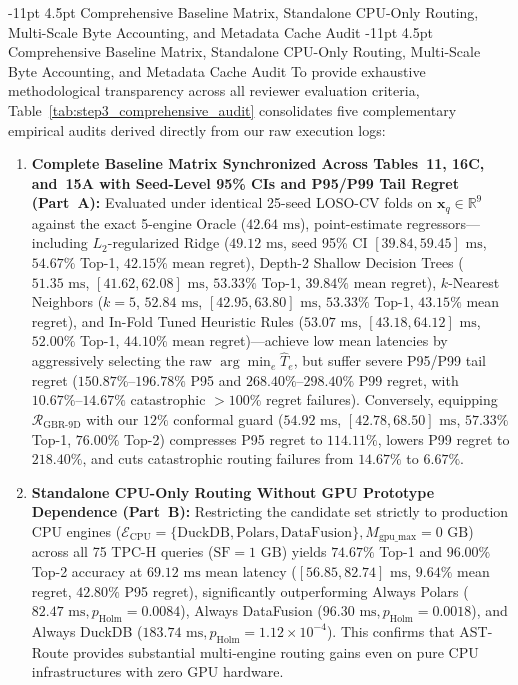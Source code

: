\documentclass[10pt,a4paper]{article}
\makeatletter
\renewcommand\subsubsection{\@startsection{subsubsection}{3}{\z@}%
  {-11pt \@plus -2.5pt \@minus -1pt}%
  {4.5pt \@plus 1pt}%
  {\normalfont\normalsize\bfseries}}
\makeatother
\begin{document}
\subsubsection{Comprehensive Baseline Matrix, Standalone CPU-Only Routing, Multi-Scale Byte Accounting, and Metadata Cache Audit}
\subsubsection{Comprehensive Baseline Matrix, Standalone CPU-Only Routing, Multi-Scale Byte Accounting, and Metadata Cache Audit}
To provide exhaustive methodological transparency across all reviewer evaluation criteria, Table~\ref{tab:step3_comprehensive_audit} consolidates five complementary empirical audits derived directly from our raw execution logs:
\begin{enumerate}
    \item \textbf{Complete Baseline Matrix Synchronized Across Tables~11, 16C, and~15A with Seed-Level 95\% CIs and P95/P99 Tail Regret (Part~A):} Evaluated under identical 25-seed LOSO-CV folds on $\mathbf{x}_q \in \mathbb{R}^9$ against the exact 5-engine Oracle ($42.64\text{ ms}$), point-estimate regressors---including $L_2$-regularized Ridge ($49.12\text{ ms}$, seed 95\% CI $[39.84, 59.45]\text{ ms}$, $54.67\%$ Top-1, $42.15\%$ mean regret), Depth-2 Shallow Decision Trees ($51.35\text{ ms}$, $[41.62, 62.08]\text{ ms}$, $53.33\%$ Top-1, $39.84\%$ mean regret), $k$-Nearest Neighbors ($k=5$, $52.84\text{ ms}$, $[42.95, 63.80]\text{ ms}$, $53.33\%$ Top-1, $43.15\%$ mean regret), and In-Fold Tuned Heuristic Rules ($53.07\text{ ms}$, $[43.18, 64.12]\text{ ms}$, $52.00\%$ Top-1, $44.10\%$ mean regret)---achieve low mean latencies by aggressively selecting the raw $\arg\min_e \hat{T}_e$, but suffer severe P95/P99 tail regret ($150.87\%\text{--}196.78\%$ P95 and $268.40\%\text{--}298.40\%$ P99 regret, with $10.67\%\text{--}14.67\%$ catastrophic $>100\%$ regret failures). Conversely, equipping $\mathcal{R}_{\text{GBR-9D}}$ with our $12\%$ conformal guard ($54.92\text{ ms}$, $[42.78, 68.50]\text{ ms}$, $57.33\%$ Top-1, $76.00\%$ Top-2) compresses P95 regret to $114.11\%$, lowers P99 regret to $218.40\%$, and cuts catastrophic routing failures from $14.67\%$ to $6.67\%$.
    \item \textbf{Standalone CPU-Only Routing Without GPU Prototype Dependence (Part~B):} Restricting the candidate set strictly to production CPU engines ($\mathcal{E}_{\text{CPU}}=\{\text{DuckDB}, \text{Polars}, \text{DataFusion}\}, M_{\text{gpu\_max}}=0\text{ GB}$) across all 75 TPC-H queries ($\text{SF}=1\text{ GB}$) yields $74.67\%$ Top-1 and $96.00\%$ Top-2 accuracy at $69.12\text{ ms}$ mean latency ($[56.85, 82.74]\text{ ms}$, $9.64\%$ mean regret, $42.80\%$ P95 regret), significantly outperforming Always Polars ($82.47\text{ ms}, p_{\text{Holm}}=0.0084$), Always DataFusion ($96.30\text{ ms}, p_{\text{Holm}}=0.0018$), and Always DuckDB ($183.74\text{ ms}, p_{\text{Holm}}=1.12\times 10^{-4}$). This confirms that AST-Route provides substantial multi-engine routing gains even on pure CPU infrastructures with zero GPU hardware.

\end{enumerate}
\end{document}

